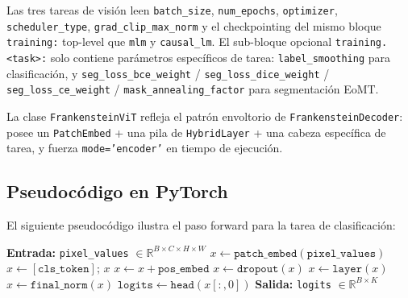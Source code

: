 Las tres tareas de visión leen \texttt{batch\_size}, \texttt{num\_epochs}, \texttt{optimizer}, \texttt{scheduler\_type}, \texttt{grad\_clip\_max\_norm} y el checkpointing del mismo bloque \texttt{training:} top-level que \texttt{mlm} y \texttt{causal\_lm}. El sub-bloque opcional \texttt{training.<task>:} solo contiene parámetros específicos de tarea: \texttt{label\_smoothing} para clasificación, y \texttt{seg\_loss\_bce\_weight} / \texttt{seg\_loss\_dice\_weight} / \texttt{seg\_loss\_ce\_weight} / \texttt{mask\_annealing\_factor} para segmentación EoMT.

La clase \texttt{FrankensteinViT} refleja el patrón envoltorio de \texttt{FrankensteinDecoder}: posee un \texttt{PatchEmbed} + una pila de \texttt{HybridLayer} + una cabeza específica de tarea, y fuerza \texttt{mode='encoder'} en tiempo de ejecución.

\subsection{Pseudocódigo en PyTorch}

El siguiente pseudocódigo ilustra el paso forward para la tarea de clasificación:

\begin{algorithmic}[1]
\State \textbf{Entrada:} \texttt{pixel\_values} $\in \mathbb{R}^{B \times C \times H \times W}$
\State $x \gets \texttt{patch\_embed}(\texttt{pixel\_values})$ 
\State $x \gets [\texttt{cls\_token}];\, x$ 
\State $x \gets x + \texttt{pos\_embed}$ 
\State $x \gets \texttt{dropout}(x)$
    \State $x \gets \texttt{layer}(x)$ 
\EndFor
\State $x \gets \texttt{final\_norm}(x)$
\State $\texttt{logits} \gets \texttt{head}(x[:, 0])$ 
\State \textbf{Salida:} \texttt{logits} $\in \mathbb{R}^{B \times K}$
\end{algorithmic}